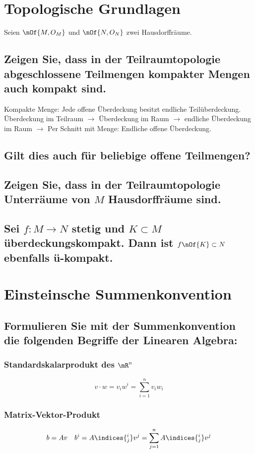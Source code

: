 \documentclass[11pt,a4paper]{scrartcl}
\begin{document}
	\section{Topologische Grundlagen}
	Seien $\nOf{M,O_M}$ und $\nOf{N,O_N}$ zwei Hausdorffräume.
	\subsection{Zeigen Sie, dass in der Teilraumtopologie abgeschlossene Teilmengen kompakter Mengen auch kompakt sind.}
	Kompakte Menge: Jede offene Überdeckung besitzt endliche Teilüberdeckung. Überdeckung im Teilraum $\rightarrow$ Überdeckung im Raum $\rightarrow$ endliche Überdeckung im Raum $\rightarrow$ Per Schnitt mit Menge: Endliche offene Überdeckung.
	\subsection{Gilt dies auch für beliebige offene Teilmengen?}
	\subsection{Zeigen Sie, dass in der Teilraumtopologie Unterräume von $M$ Hausdorffräume sind.}
	\subsection{Sei $f: M \to N$ stetig und $K \subset M$ überdeckungskompakt. Dann ist $f\nOf{K} \subset N$ ebenfalls ü-kompakt.}
	\section{Einsteinsche Summenkonvention}
	\subsection{Formulieren Sie mit der Summenkonvention die folgenden Begriffe der Linearen Algebra:}
	\subsubsection{Standardskalarprodukt des $\mR^n$}
	\begin{equation}
		v \cdot w = v_i w^i = \sum\limits_{i=1}^{n} v_i w_i
	\end{equation}
	\subsubsection{Matrix-Vektor-Produkt}
	\begin{equation}
		b = A v \quad b^i = A\indices{^i_j} v^j = \sum\limits_{j=1}^n A\indices{^i_j} v^j
	\end{equation}
\end{document}
